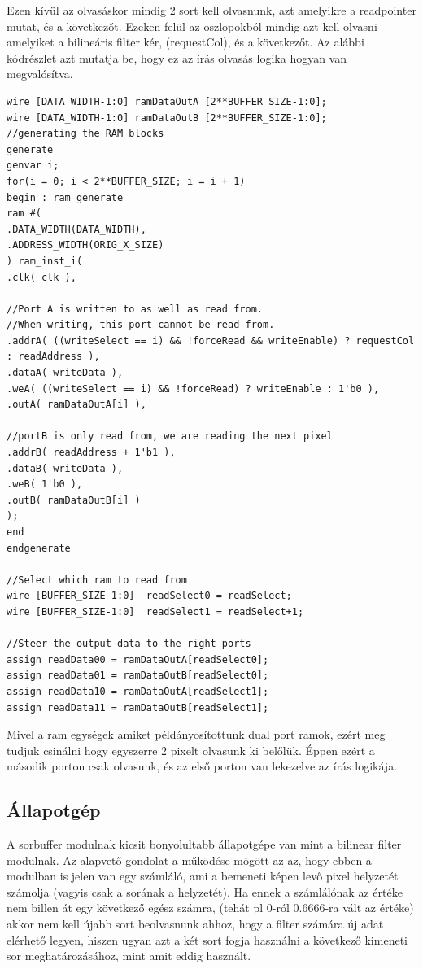 Ezen kívül az olvasáskor mindig 2 sort kell olvasnunk, azt amelyikre a readpointer mutat, és a következőt. Ezeken felül az oszlopokból mindig azt kell olvasni amelyiket a bilineáris filter kér, (requestCol), és a következőt. Az alábbi kódrészlet azt mutatja be, hogy ez az írás olvasás logika hogyan van megvalósítva.

\begin{verbatim}
wire [DATA_WIDTH-1:0] ramDataOutA [2**BUFFER_SIZE-1:0];
wire [DATA_WIDTH-1:0] ramDataOutB [2**BUFFER_SIZE-1:0];
//generating the RAM blocks 
generate
genvar i;
for(i = 0; i < 2**BUFFER_SIZE; i = i + 1)
begin : ram_generate
ram #(
.DATA_WIDTH(DATA_WIDTH),
.ADDRESS_WIDTH(ORIG_X_SIZE)
) ram_inst_i(
.clk( clk ),

//Port A is written to as well as read from. 
//When writing, this port cannot be read from.
.addrA( ((writeSelect == i) && !forceRead && writeEnable) ? requestCol : readAddress ),
.dataA( writeData ),													
.weA( ((writeSelect == i) && !forceRead) ? writeEnable : 1'b0 ),
.outA( ramDataOutA[i] ),

//portB is only read from, we are reading the next pixel 
.addrB( readAddress + 1'b1 ),
.dataB( writeData ),
.weB( 1'b0 ),
.outB( ramDataOutB[i] )
);
end
endgenerate

//Select which ram to read from
wire [BUFFER_SIZE-1:0]	readSelect0 = readSelect;
wire [BUFFER_SIZE-1:0]	readSelect1 = readSelect+1;

//Steer the output data to the right ports
assign readData00 = ramDataOutA[readSelect0];
assign readData01 = ramDataOutB[readSelect0];
assign readData10 = ramDataOutA[readSelect1];
assign readData11 = ramDataOutB[readSelect1];
\end{verbatim}

Mivel a ram egységek amiket példányosítottunk dual port ramok, ezért meg tudjuk csinálni hogy egyszerre 2 pixelt olvasunk ki belőlük. Éppen ezért a második porton csak olvasunk, és az első porton van lekezelve az írás logikája.

\subsection{Állapotgép}

A sorbuffer modulnak kicsit bonyolultabb állapotgépe van mint a bilinear filter modulnak. Az alapvető gondolat a működése mögött az az, hogy ebben a modulban is jelen van egy számláló, ami a bemeneti képen levő pixel helyzetét számolja (vagyis csak a sorának a helyzetét). Ha ennek a számlálónak az értéke nem billen át egy következő egész számra, (tehát pl 0-ról 0.6666-ra vált az értéke) akkor nem kell újabb sort beolvasnunk ahhoz, hogy a filter számára új adat elérhető legyen, hiszen ugyan azt a két sort fogja használni a következő kimeneti sor meghatározásához, mint amit eddig használt. 


